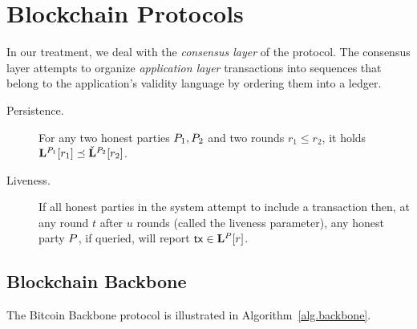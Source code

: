 
\section{Blockchain Protocols}

In our treatment, we deal with the \emph{consensus layer}
of the protocol. The consensus layer attempts to organize
\emph{application layer} transactions into sequences that belong to the
application's validity language by ordering them into a ledger.

\begin{definition}[Ledger]
\end{definition}

\begin{description}
  \item[Persistence.]
    For any two honest parties $P_1,P_2$ and two rounds $r_1\leq r_2$,
    it holds  $\mathbf{L}^{P_1}[r_1] \preceq
    \check{\mathbf{L}}^{P_2}[r_2]$.

  \item[Liveness.]
    If all honest parties in the system attempt to include a  transaction
    then, at any round $t$ after $u$ rounds (called the
    liveness parameter), any honest party $P$, if queried,
    will report $\mathsf{tx} \in \mathbf{L}^{P}[r]$.
\end{description}


\subsection{Blockchain Backbone}

\cite{backbone,pass-asynchronous,varbackbone}

The Bitcoin Backbone protocol is illustrated in Algorithm~\ref{alg.backbone}.




